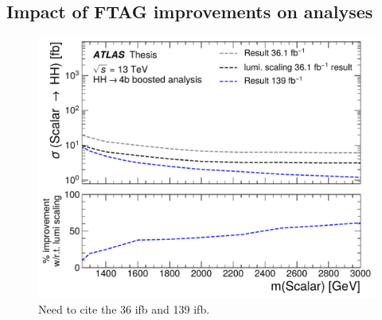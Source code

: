 \begin{figure}[htbp]
    \centering
    \caption{}
    \label{fig:\jetdef-fig3}
\end{figure}

\subsection{Impact of FTAG improvements on analyses}

\begin{figure}
\centering
\includegraphics[width=\textwidth]{figures/my_dihiggs/HH4b-boosted-vr-trk-jet-improvements.pdf}
\caption{Need to cite the 36 ifb and 139 ifb.}
\label{fig:boosted-vr-trk-jet-improvements}
\end{figure}
